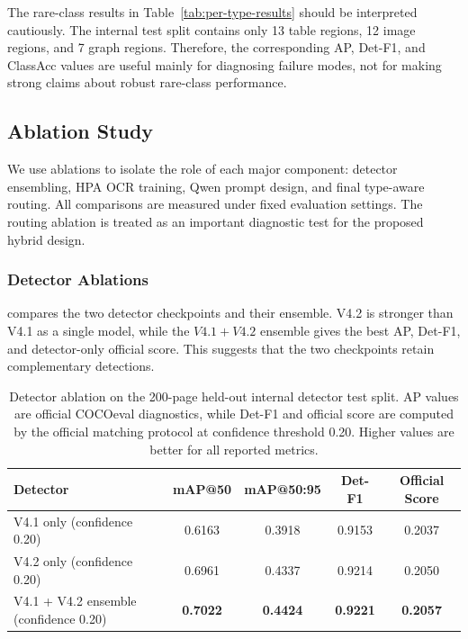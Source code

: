 \documentclass[runningheads]{llncs}
\newcommand{\metrichead}[1]{#1}
\begin{document}
The rare-class results in Table~\ref{tab:per-type-results} should be interpreted cautiously. The internal test split contains only 13 table regions, 12 image regions, and 7 graph regions. Therefore, the corresponding AP, Det-F1, and ClassAcc values are useful mainly for diagnosing failure modes, not for making strong claims about robust rare-class performance.

\subsection{Ablation Study}
\label{sec:ablation}

We use ablations to isolate the role of each major component: detector ensembling, HPA OCR training, Qwen prompt design, and final type-aware routing. All comparisons are measured under fixed evaluation settings. The routing ablation is treated as an important diagnostic test for the proposed hybrid design.

\subsubsection{Detector Ablations}

 compares the two detector checkpoints and their ensemble. V4.2 is stronger than V4.1 as a single model, while the $V4.1+V4.2$ ensemble gives the best AP, Det-F1, and detector-only official score. 
This suggests that the two checkpoints retain complementary detections.

\begin{table}[tb]
  \caption{Detector ablation on the 200-page held-out internal detector test split. AP values are official COCOeval diagnostics, while Det-F1 and official score are computed by the official matching protocol at confidence threshold 0.20. Higher values are better for all reported metrics.}
  \label{tab:detector-ablation}
  \centering
  \begingroup
  \footnotesize
  \setlength{\tabcolsep}{3pt}
  \renewcommand{\arraystretch}{1.05}
  \begin{tabularx}{\linewidth}{@{}Ycccc@{}}
    \toprule
    Detector & \metrichead{mAP@50} & \metrichead{mAP@50:95} & \metrichead{Det-F1} & \metrichead{Official Score} \\
    \midrule
    V4.1 only (confidence 0.20) & 0.6163 & 0.3918 & 0.9153 & 0.2037 \\
    V4.2 only (confidence 0.20) & 0.6961 & 0.4337 & 0.9214 & 0.2050 \\
    V4.1 + V4.2 ensemble (confidence 0.20) & \textbf{0.7022} & \textbf{0.4424} & \textbf{0.9221} & \textbf{0.2057} \\
    \bottomrule
  \end{tabularx}
  \endgroup
\end{table}
\end{document}
